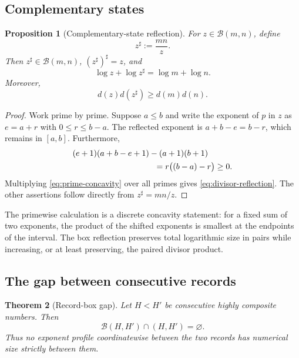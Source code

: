 \documentclass[11pt]{article}
\numberwithin{equation}{section}
\theoremstyle{blueplain}
\newtheorem{theorem}{Theorem}[section]
\newtheorem{proposition}[theorem]{Proposition}
\theoremstyle{bluedef}
\newcommand{\Bcal}{\mathcal B}
\begin{document}
\subsection{Complementary states}

\begin{proposition}[Complementary-state reflection]
\label{prop:box-reflection}
For $z\in\Bcal(m,n)$, define
\begin{equation}
 z^\sharp:=\frac{mn}{z}.
 \label{eq:sharp-definition}
\end{equation}
Then $z^\sharp\in\Bcal(m,n)$, $(z^\sharp)^\sharp=z$, and
\begin{equation}
 \log z+\log z^\sharp=\log m+\log n.
 \label{eq:log-reflection}
\end{equation}
Moreover,
\begin{equation}
 \boxed{d(z)d(z^\sharp)\ge d(m)d(n).}
 \label{eq:divisor-reflection}
\end{equation}
\end{proposition}

\begin{proof}
Work prime by prime.  Suppose $a\le b$ and write the exponent of $p$ in $z$ as $e=a+r$ with $0\le r\le b-a$.  The reflected exponent is $a+b-e=b-r$, which remains in $[a,b]$.  Furthermore,
\begin{align}
 &(e+1)(a+b-e+1)-(a+1)(b+1)\nonumber\\
 &\hspace{35mm}=r\bigl((b-a)-r\bigr)\ge0.
 \label{eq:prime-concavity}
\end{align}
Multiplying \eqref{eq:prime-concavity} over all primes gives \eqref{eq:divisor-reflection}.  The other assertions follow directly from $z^\sharp=mn/z$.
\end{proof}

The primewise calculation is a discrete concavity statement: for a fixed sum of two exponents, the product of the shifted exponents is smallest at the endpoints of the interval.  The box reflection preserves total logarithmic size in pairs while increasing, or at least preserving, the paired divisor product.

\subsection{The gap between consecutive records}

\begin{theorem}[Record-box gap]
\label{thm:record-box-gap}
Let $H<H'$ be consecutive highly composite numbers.  Then
\begin{equation}
 \boxed{\Bcal(H,H')\cap(H,H')=\varnothing.}
 \label{eq:record-box-gap}
\end{equation}
Thus no exponent profile coordinatewise between the two records has numerical size strictly between them.
\end{theorem}
\end{document}
